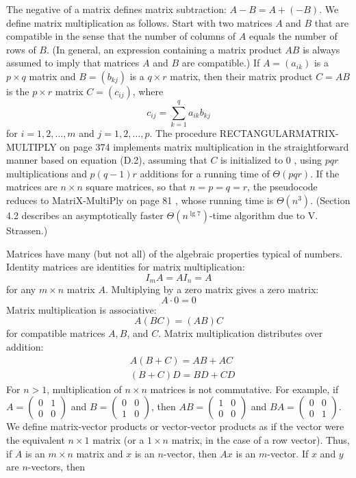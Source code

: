 \documentclass[lang=cn,newtx,10pt,scheme=chinese]{elegantbook}
\begin{document}
The negative of a matrix defines matrix subtraction: $A-B=A+(-B)$.
We define matrix multiplication as follows. Start with two matrices $A$ and $B$ that are compatible in the sense that the number of columns of $A$ equals the number of rows of $B$. (In general, an expression containing a matrix product $A B$ is always assumed to imply that matrices $A$ and $B$ are compatible.) If $A=\left(a_{i k}\right)$ is a $p \times q$ matrix and $B=\left(b_{k j}\right)$ is a $q \times r$ matrix, then their matrix product $C=A B$ is the $p \times r$ matrix $C=\left(c_{i j}\right)$, where
$$
c_{i j}=\sum_{k=1}^q a_{i k} b_{k j}
$$
for $i=1,2, \ldots, m$ and $j=1,2, \ldots, p$. The procedure RECTANGULARMATRIX-MULTIPLY on page 374 implements matrix multiplication in the straightforward manner based on equation (D.2), assuming that $C$ is initialized to 0 , using $p q r$ multiplications and $p(q-1) r$ additions for a running time of $\Theta(p q r)$. If the matrices are $n \times n$ square matrices, so that $n=p=q=r$, the pseudocode reduces to MatriX-MultiPly on page 81 , whose running time is $\Theta\left(n^3\right)$. (Section 4.2 describes an asymptotically faster $\Theta\left(n^{\lg 7}\right)$-time algorithm due to V. Strassen.)

Matrices have many (but not all) of the algebraic properties typical of numbers. Identity matrices are identities for matrix multiplication:
$$
I_m A=A I_n=A
$$
for any $m \times n$ matrix $A$. Multiplying by a zero matrix gives a zero matrix:
$$
A \cdot 0=0
$$
Matrix multiplication is associative:
$$
A(B C)=(A B) C
$$
for compatible matrices $A, B$, and $C$. Matrix multiplication distributes over addition:
$$
\begin{aligned}
& A(B+C)=A B+A C \\
& (B+C) D=B D+C D
\end{aligned}
$$
For $n>1$, multiplication of $n \times n$ matrices is not commutative. For example, if $A=\left(\begin{array}{ll}0 & 1 \\ 0 & 0\end{array}\right)$ and $B=\left(\begin{array}{ll}0 & 0 \\ 1 & 0\end{array}\right)$, then $A B=\left(\begin{array}{ll}1 & 0 \\ 0 & 0\end{array}\right)$ and $B A=\left(\begin{array}{ll}0 & 0 \\ 0 & 1\end{array}\right)$.
We define matrix-vector products or vector-vector products as if the vector were the equivalent $n \times 1$ matrix (or a $1 \times n$ matrix, in the case of a row vector). Thus, if $A$ is an $m \times n$ matrix and $x$ is an $n$-vector, then $A x$ is an $m$-vector. If $x$ and $y$ are $n$-vectors, then
\end{document}

